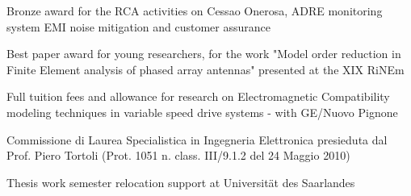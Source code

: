 \documentclass[9pt,a4paper,ragged2e,withhyper]{altacv} %
\begin{document}
\begin{paracol}{2}
{Bronze award for the RCA activities on Cessao Onerosa, ADRE monitoring system EMI noise mitigation and customer assurance}
\divider

{Best paper award for young researchers, for the work "Model order reduction in Finite Element analysis of phased array antennas" presented at the XIX RiNEm}
\divider

{Full tuition fees and allowance for research on Electromagnetic Compatibility modeling techniques in variable speed drive systems - with GE/Nuovo Pignone}
\divider

{Commissione di Laurea Specialistica in Ingegneria Elettronica presieduta dal Prof. Piero Tortoli (Prot. 1051 n. class. III/9.1.2 del 24 Maggio 2010)}
\divider

{Thesis work semester relocation support at Universit\"at des Saarlandes}


\medskip
{}
\medskip
{}
\medskip
{}



{\LaTeXraggedright
\par}


\end{paracol}
\end{document}
